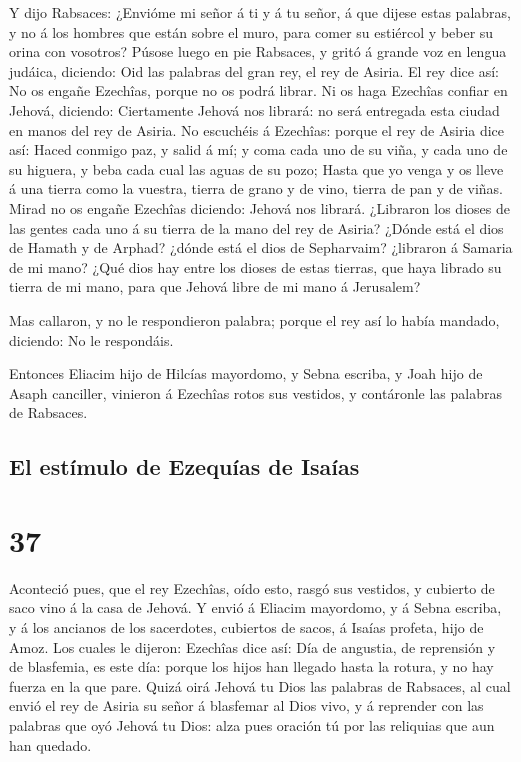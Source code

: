  Y dijo Rabsaces: ¿Envióme mi señor á ti y á tu señor, á
que dijese estas palabras, y no á los hombres que están sobre el muro,
para comer su estiércol y beber su orina con vosotros? 
Púsose luego en pie Rabsaces, y gritó á grande voz en lengua judáica,
diciendo: Oid las palabras del gran rey, el rey de Asiria.
 El rey dice así: No os engañe Ezechîas, porque no os
podrá librar.  Ni os haga Ezechîas confiar en Jehová,
diciendo: Ciertamente Jehová nos librará: no será entregada esta ciudad
en manos del rey de Asiria.  No escuchéis á Ezechîas:
porque el rey de Asiria dice así: Haced conmigo paz, y salid á mí; y
coma cada uno de su viña, y cada uno de su higuera, y beba cada cual las
aguas de su pozo;  Hasta que yo venga y os lleve á una
tierra como la vuestra, tierra de grano y de vino, tierra de pan y de
viñas.  Mirad no os engañe Ezechîas diciendo: Jehová nos
librará. ¿Libraron los dioses de las gentes cada uno á su tierra de la
mano del rey de Asiria?  ¿Dónde está el dios de Hamath y
de Arphad? ¿dónde está el dios de Sepharvaim? ¿libraron á Samaria de mi
mano?  ¿Qué dios hay entre los dioses de estas tierras,
que haya librado su tierra de mi mano, para que Jehová libre de mi mano
á Jerusalem?

 Mas callaron, y no le respondieron palabra; porque el
rey así lo había mandado, diciendo: No le respondáis.

 Entonces Eliacim hijo de Hilcías mayordomo, y Sebna
escriba, y Joah hijo de Asaph canciller, vinieron á Ezechîas rotos sus
vestidos, y contáronle las palabras de Rabsaces.

\hypertarget{el-estuxedmulo-de-ezequuxedas-de-isauxedas}{%
\subsection{El estímulo de Ezequías de
Isaías}\label{el-estuxedmulo-de-ezequuxedas-de-isauxedas}}

\hypertarget{section-36}{%
\section{37}\label{section-36}}

 Aconteció pues, que el rey Ezechîas, oído esto, rasgó sus
vestidos, y cubierto de saco vino á la casa de Jehová.  Y
envió á Eliacim mayordomo, y á Sebna escriba, y á los ancianos de los
sacerdotes, cubiertos de sacos, á Isaías profeta, hijo de Amoz.
 Los cuales le dijeron: Ezechîas dice así: Día de
angustia, de reprensión y de blasfemia, es este día: porque los hijos
han llegado hasta la rotura, y no hay fuerza en la que pare.
 Quizá oirá Jehová tu Dios las palabras de Rabsaces, al
cual envió el rey de Asiria su señor á blasfemar al Dios vivo, y á
reprender con las palabras que oyó Jehová tu Dios: alza pues oración tú
por las reliquias que aun han quedado.

